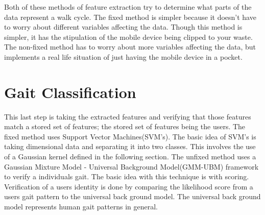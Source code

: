 \documentclass{sig-alternate}
\begin{document}
	Both of these methods of feature extraction try to determine what parts of the data represent a walk cycle. The fixed method is simpler because it doesn't have to worry about different variables affecting the data. Though this method is simpler, it has the stipulation of the mobile device being clipped to your waste. The non-fixed method has to worry about more variables affecting the data, but implements a real life situation of just having the mobile device in a pocket.
	
	
\section{Gait Classification}
	This last step is taking the extracted features and verifying that those features match a stored set of features; the stored set of features being the users. The fixed method uses Support Vector Machines(SVM's). The basic idea of SVM's is taking dimensional data and separating it into two classes. This involves the use of a Gaussian kernel defined in the following section. The unfixed method uses a Gaussian Mixture Model - Universal Background Model(GMM-UBM) framework to verify a individuals gait. The basic idea with this technique is with scoring. Verification of a users identity is done by comparing the likelihood score from a users gait pattern to the universal back ground model. The universal back ground model represents human gait patterns in general.
\end{document}
